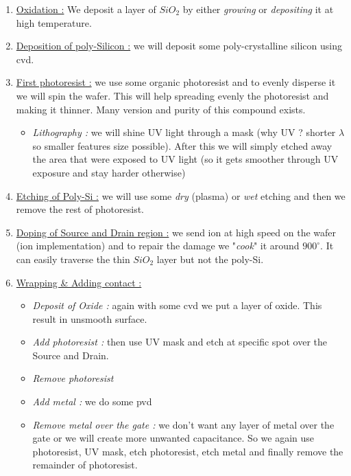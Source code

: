 \documentclass[
]{article}
\providecommand{\tightlist}{%
  \setlength{\itemsep}{0pt}\setlength{\parskip}{0pt}}
\begin{document}
\begin{enumerate}
\def\labelenumi{\arabic{enumi}.}
\item
  \ul{Oxidation :} We deposit a layer of \(SiO_2\) by either
  \emph{growing} or \emph{depositing} it at high temperature.
\item
  \ul{Deposition of poly-Silicon :} we will deposit some
  poly-crystalline silicon using {cvd}.
\item
  \ul{First photoresist :} we use some organic photoresist and to evenly
  disperse it we will spin the wafer. This will help spreading evenly
  the photoresist and making it thinner. Many version and purity of this
  compound exists.

  \begin{itemize}
  \tightlist
  \item
    \emph{Lithography :} we will shine UV light through a mask (why UV ?
    shorter \(\lambda\) so smaller features size possible). After this
    we will simply etched away the area that were exposed to UV light
    (so it gets smoother through UV exposure and stay harder otherwise)
  \end{itemize}
\item
  \ul{Etching of Poly-Si :} we will use some \emph{dry} (plasma) or
  \emph{wet} etching and then we remove the rest of photoresist.
\item
  \ul{Doping of Source and Drain region :} we send ion at high speed on
  the wafer (ion implementation) and to repair the damage we
  "\emph{cook}" it around \(900^\circ\). It can easily traverse the thin
  \(SiO_2\) layer but not the poly-Si.
\item
  \ul{Wrapping \& Adding contact :}

  \begin{itemize}
  \item
    \emph{Deposit of Oxide :} again with some {cvd} we put a layer of
    oxide. This result in unsmooth surface.
  \item
    \emph{Add photoresist :} then use UV mask and etch at specific spot
    over the Source and Drain.
  \item
    \emph{Remove photoresist}
  \item
    \emph{Add metal :} we do some {pvd}
  \item
    \emph{Remove metal over the gate :} we don't want any layer of metal
    over the gate or we will create more unwanted capacitance. So we
    again use photoresist, UV mask, etch photoresist, etch metal and
    finally remove the remainder of photoresist.
  \end{itemize}
\end{enumerate}
\end{document}
